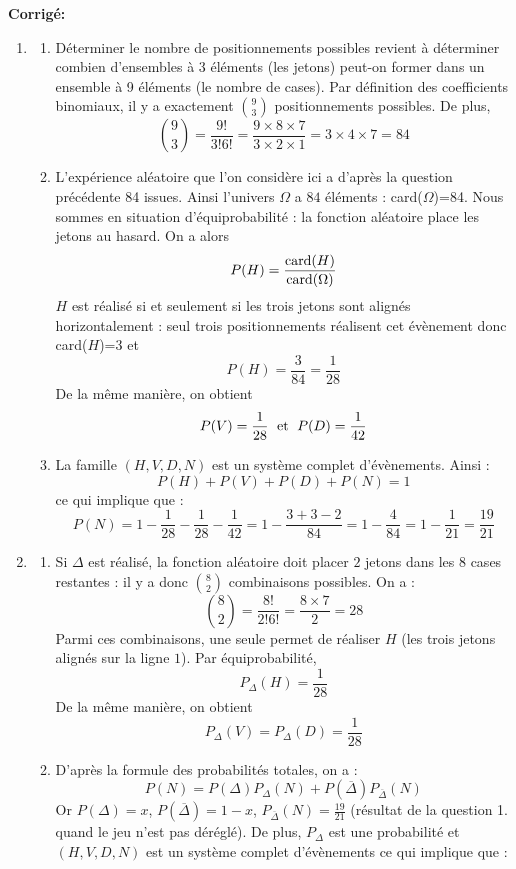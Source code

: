 \documentclass[a4paper,twoside,french,10pt]{VcCours}
\newcommand{\corr}{\textbf{Corrigé:}}
\begin{document}
\corr \begin{enumerate}
\item 
\begin{enumerate}
\item Déterminer le nombre de positionnements possibles revient à déterminer combien d'ensembles à 3 éléments (les jetons) peut-on former dans un ensemble à 9 éléments (le nombre de cases). Par définition des coefficients binomiaux, il y a exactement $\binom{9}{3}$ positionnements possibles. De plus,
\[ \binom{9}{3} = \frac{9!}{3!6!}= \frac{9 \times 8 \times 7}{3 \times 2 \times 1} = 3\times 4 \times 7 =84 \]
\item L'expérience aléatoire que l'on considère ici a d'après la question précédente 84 issues. Ainsi l'univers $\Omega$ a $84$ éléments : card($\Omega$)=84. Nous sommes en situation d'équiprobabilité : la fonction aléatoire place les jetons au hasard. On a alors 
\[ P(H)= \frac{\hbox{card}(H)}{\hbox{card}(\Omega)} \]
$H$ est réalisé si et seulement si les trois jetons sont alignés horizontalement : seul trois positionnements réalisent cet évènement donc card($H$)=$3$ et 
$$P(H) = \frac{3}{84} = \frac{1}{28} $$
De la même manière, on obtient 
$$P(V) = \frac{1}{28} \; \hbox{ et } \; P(D) = \frac{1}{42} $$
\item La famille $(H,V,D,N)$ est un système complet d'évènements. Ainsi : 
\[ P(H) + P(V) + P(D) + P(N) = 1 \]
ce qui implique que  :
\[ P(N) = 1 - \frac{1}{28} - \frac{1}{28} -\frac{1}{42} = 1-\frac{3+3-2}{84} = 1-\frac{4}{84} = 1-\frac{1}{21} = \frac{19}{21} \]
\end{enumerate}
\item 
\begin{enumerate}
\item Si $\Delta$ est réalisé, la fonction aléatoire doit placer $2$ jetons dans les $8$ cases restantes : il y a donc $\binom{8}{2}$ combinaisons possibles. On a :
\[ \binom{8}{2} = \frac{8!}{2!6!} = \frac{8 \times 7}{2} = 28 \]
Parmi ces combinaisons, une seule permet de réaliser $H$ (les trois jetons alignés sur la ligne $1$). Par équiprobabilité,
\[ P_{\Delta}(H) = \frac{1}{28} \]
De la même manière, on obtient 
$$P_{\Delta}(V) =  P_{\Delta}(D) = \frac{1}{28} $$
\item D'après la formule des probabilités totales, on a :
\[ P(N) = P(\Delta) P_{\Delta}(N) + P(\overline{\Delta}) P_{\overline{\Delta}}(N) \]
Or $P(\Delta)=x$, $P(\overline{\Delta})= 1 - x$, $P_{\overline{\Delta}}(N) = \frac{19}{21}$ (résultat de la question 1. quand le jeu n'est pas déréglé). De plus, $P_{\Delta}$ est une probabilité et $(H,V,D,N)$ est un système complet d'évènements ce qui implique que :

\end{enumerate}
\end{enumerate}
\end{document}
